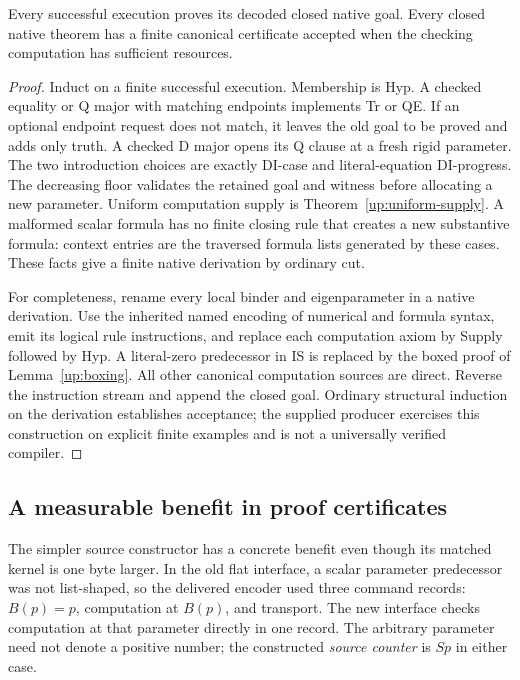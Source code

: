 \begin{theorem}
Every successful execution proves its decoded closed native goal. Every
closed native theorem has a finite canonical certificate accepted when
the checking computation has sufficient resources.
\end{theorem}
\begin{proof}
Induct on a finite successful execution. Membership is Hyp. A checked
equality or Q major with matching endpoints implements Tr or QE. If an
optional endpoint request does not match, it leaves the old goal to be
proved and adds only truth. A checked D major opens its Q clause at a
fresh rigid parameter. The two introduction choices are exactly DI-case
and literal-equation DI-progress. The decreasing floor validates the
retained goal and witness before allocating a new parameter. Uniform
computation supply is Theorem~\ref{up:uniform-supply}. A malformed scalar
formula has no finite closing rule that creates a new substantive formula:
context entries are the traversed formula lists generated by these cases.
These facts give a finite native derivation by ordinary cut.

For completeness, rename every local binder and eigenparameter in a
native derivation. Use the inherited named encoding of numerical and
formula syntax, emit its logical rule instructions, and replace each
computation axiom by Supply followed by Hyp. A literal-zero predecessor
in IS is replaced by the boxed proof of Lemma~\ref{up:boxing}. All other
canonical computation sources are direct. Reverse the instruction stream
and append the closed goal. Ordinary structural induction on the derivation
establishes acceptance; the supplied producer exercises this construction
on explicit finite examples and is not a universally verified compiler.
\end{proof}

\subsection{A measurable benefit in proof certificates}

The simpler source constructor has a concrete benefit even though its
matched kernel is one byte larger. In the old flat interface, a scalar
parameter predecessor was not list-shaped, so the delivered encoder used
three command records: $B(p)=p$, computation at $B(p)$, and transport.
The new interface checks computation at that parameter directly in one
record. The arbitrary parameter need not denote a positive number; the
constructed \emph{source counter} is $Sp$ in either case.

